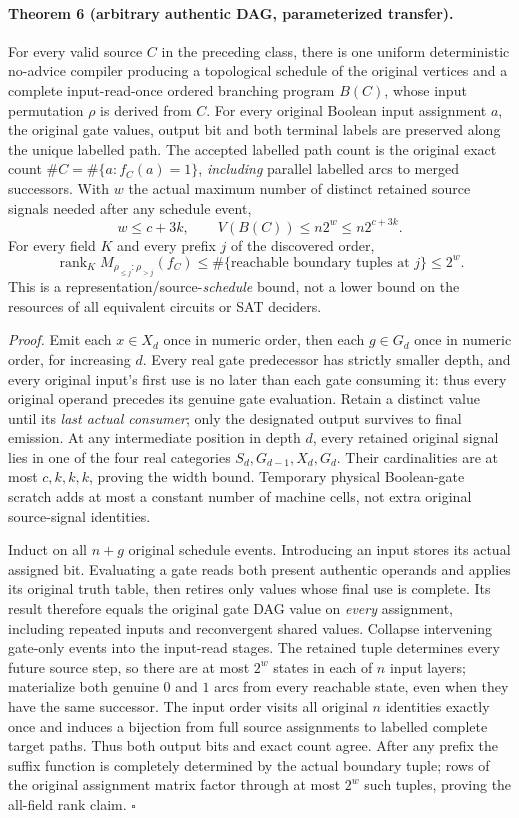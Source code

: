 \documentclass[11pt]{article}
\begin{document}
\paragraph{Theorem 6 (arbitrary authentic DAG, parameterized transfer).}
For every valid source $C$ in the preceding class, there is one
uniform deterministic no-advice compiler producing a topological
schedule of the original vertices and a complete input-read-once
ordered branching program $B(C)$, whose input permutation $\rho$
is derived from $C$. For every original Boolean input assignment $a$,
the original gate values, output bit and both terminal labels are
preserved along the unique labelled path.
The accepted labelled path count is the original exact count
$\#C=\#\{a:f_C(a)=1\}$, \emph{including} parallel labelled
arcs to merged successors. With $w$ the actual maximum number
of distinct retained source signals needed after any schedule event,
\[
\boxed{w\le c+3k,\qquad
V(B(C))\le n2^w\le n2^{c+3k}.}
\]
For every field $K$ and every prefix $j$ of the discovered order,
\[
\operatorname{rank}_K M_{\rho_{\le j}:\rho_{>j}}(f_C)
\le \#\{\text{reachable boundary tuples at }j\}\le2^w.
\]
This is a representation/source-\emph{schedule} bound, not a
lower bound on the resources of all equivalent circuits or SAT deciders.

\emph{Proof.} Emit each $x\in X_d$ once in numeric order, then
each $g\in G_d$ once in numeric order, for increasing $d$.
Every real gate predecessor has strictly smaller depth, and every
original input's first use is no later than each gate consuming it:
thus every original operand precedes its genuine gate evaluation.
Retain a distinct value until its \emph{last actual consumer};
only the designated output survives to final emission.
At any intermediate position in depth $d$, every retained original
signal lies in one of the four real categories $S_d,G_{d-1},X_d,G_d$.
Their cardinalities are at most $c,k,k,k$, proving the width bound.
Temporary physical Boolean-gate scratch adds at most a constant number
of machine cells, not extra original source-signal identities.

Induct on all $n+g$ original schedule events. Introducing an input
stores its actual assigned bit. Evaluating a gate reads both present
authentic operands and applies its original truth table, then retires
only values whose final use is complete. Its result therefore equals
the original gate DAG value on \emph{every} assignment, including
repeated inputs and reconvergent shared values. Collapse intervening
gate-only events into the input-read stages. The retained tuple
determines every future source step, so there are at most $2^w$
states in each of $n$ input layers; materialize both genuine $0$ and
$1$ arcs from every reachable state, even when they have the same
successor. The input order visits all original $n$ identities exactly
once and induces a bijection from full source assignments to labelled
complete target paths. Thus both output bits and exact count agree.
After any prefix the suffix function is completely determined by
the actual boundary tuple; rows of the original assignment matrix
factor through at most $2^w$ such tuples, proving the all-field rank
claim. \hfill$\square$
\end{document}
